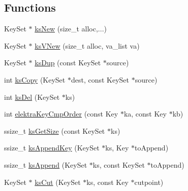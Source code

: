 \subsection*{Functions}
\begin{DoxyCompactItemize}
\item 
Key\-Set $\ast$ \hyperlink{group__keyset_ga671e1aaee3ae9dc13b4834a4ddbd2c3c}{ks\-New} (size\-\_\-t alloc,...)
\item 
Key\-Set $\ast$ \hyperlink{group__keyset_ga4ff760f56693b51ab785ed7ce628e649}{ks\-V\-New} (size\-\_\-t alloc, va\-\_\-list va)
\begin{DoxyCompactList}\small\item\em \end{DoxyCompactList}\item 
Key\-Set $\ast$ \hyperlink{group__keyset_gac59e4b328245463f1451f68d5106151c}{ks\-Dup} (const Key\-Set $\ast$source)
\item 
int \hyperlink{group__keyset_gaba1f1dbea191f4d7e7eb3e4296ae7d5e}{ks\-Copy} (Key\-Set $\ast$dest, const Key\-Set $\ast$source)
\begin{DoxyCompactList}\small\item\em \end{DoxyCompactList}\item 
int \hyperlink{group__keyset_ga27e5c16473b02a422238c8d970db7ac8}{ks\-Del} (Key\-Set $\ast$ks)
\item 
int \hyperlink{group__keyset_gab8b30dfabb0867bd6899e60e7bd193a2}{elektra\-Key\-Cmp\-Order} (const Key $\ast$ka, const Key $\ast$kb)
\item 
ssize\-\_\-t \hyperlink{group__keyset_ga7474ad6b0a0fa969dbdf267ba5770eee}{ks\-Get\-Size} (const Key\-Set $\ast$ks)
\item 
ssize\-\_\-t \hyperlink{group__keyset_gaa5a1d467a4d71041edce68ea7748ce45}{ks\-Append\-Key} (Key\-Set $\ast$ks, Key $\ast$to\-Append)
\begin{DoxyCompactList}\small\item\em \end{DoxyCompactList}\item 
ssize\-\_\-t \hyperlink{group__keyset_ga21eb9c3a14a604ee3a8bdc779232e7b7}{ks\-Append} (Key\-Set $\ast$ks, const Key\-Set $\ast$to\-Append)
\begin{DoxyCompactList}\small\item\em \end{DoxyCompactList}\item 
Key\-Set $\ast$ \hyperlink{group__keyset_ga6b00cf82b59af4d883a9bad6cf4a4a4a}{ks\-Cut} (Key\-Set $\ast$ks, const Key $\ast$cutpoint)

\end{DoxyCompactItemize}
